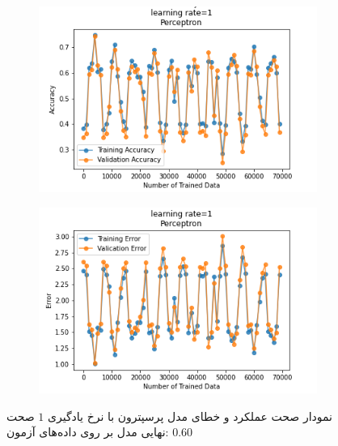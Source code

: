 \documentclass[12pt, a4paper]{article}
\begin{document}
\begin{figure}[h]
    \begin{subfigure}{0.45\linewidth}
        \centering
        \includegraphics[width=\linewidth]{images/5/perceptron/lr/acc_1.png}
    \end{subfigure}
    \hfil
    \begin{subfigure}{0.45\linewidth}
        \centering
        \includegraphics[width=\linewidth]{images/5/perceptron/lr/error_1.png}
    \end{subfigure}
    \caption{نمودار صحت عملکرد‌ و خطای مدل پرسپترون با نرخ یادگیری $1$
    \newline
    صحت نهایی مدل بر روی داده‌های آزمون: $0.60$}
\end{figure}
\clearpage
\end{document}
